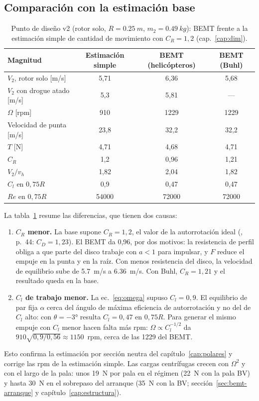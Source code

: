 \subsection{Comparación con la estimación base}

\begin{table}[H]
\centering
\caption{Punto de diseño v2 (rotor solo, $R=\SI{0.25}{m}$, $m_2=\SI{0.49}{kg}$): BEMT frente a
la estimación simple de cantidad de movimiento con $C_R=1{,}2$ (cap.~\ref{cap:dim}).}
\label{tab:bemt-base}
\begin{tabular}{lccc}
\toprule
Magnitud & Estimación simple & BEMT (helicópteros) & BEMT (Buhl) \\
\midrule
$V_2$, rotor solo [m/s]   & 5,71 & 6,36 & 5,68 \\
$V_2$ con drogue atado [m/s] & 5,3 & 5,81 & --- \\
$\Omega$ [rpm]           & \num{910} & \num{1229} & \num{1229} \\
Velocidad de punta [m/s] & 23,8 & 32,2 & 32,2 \\
$T$ [N]                  & 4,71 & 4,68 & 4,71 \\
$C_R$                    & 1,2 & 0,96 & 1,21 \\
$V_2/v_h$                & 1,82 & 2,04 & 1,82 \\
$C_l$ en $0{,}75R$       & 0,9 & 0,47 & 0,47 \\
$Re$ en $0{,}75R$        & \num{54000} & \num{72000} & \num{72000}\\
\bottomrule
\end{tabular}
\end{table}

La tabla~\ref{tab:bemt-base} resume las diferencias, que tienen dos causas:
\begin{enumerate}
  \item \textbf{$C_R$ menor.} La base supone $C_R=1{,}2$, el valor de la autorrotación
        ideal (\cite{bramwell2001}, p.~44: $C_D=1{,}23$). El BEMT da 0,96, por dos motivos:
        la resistencia de perfil obliga a que parte del disco trabaje con $a<1$ para
        impulsar, y $F$ reduce el empuje en la punta y en la raíz. Con menos resistencia del
        disco, la velocidad de equilibrio sube de \SI{5.7}{m/s} a \SI{6.36}{m/s}. Con Buhl,
        $C_R=1{,}21$ y el resultado queda en la base.
  \item \textbf{$C_l$ de trabajo menor.} La ec.~\eqref{eq:omega} supuso $C_l=0{,}9$. El
        equilibrio de par fija $\alpha$ cerca del ángulo de máxima eficiencia de
        autorrotación y no del de $C_l$ alto: con $\theta=\ang{-3}$ resulta $C_l=0{,}47$
        en $0{,}75R$. Para generar el mismo empuje con $C_l$ menor hacen falta más rpm:
        $\Omega\propto C_l^{-1/2}$ da $910\sqrt{0{,}9/0{,}56}\approx\num{1150}$~rpm,
        cerca de las \num{1229} del BEMT.
\end{enumerate}
Esto confirma la estimación por sección neutra del capítulo~\ref{cap:polares} y corrige
las rpm de la estimación simple. Las cargas centrífugas crecen con $\Omega^2$ y con el
largo de la pala: unos \SI{19}{N} por pala en el régimen (\SI{22}{N} con la pala BV) y hasta \SI{30}{N} en el sobrepaso
del arranque (\SI{35}{N} con la BV; sección~\ref{sec:bemt-arranque} y capítulo~\ref{cap:estructura}).

